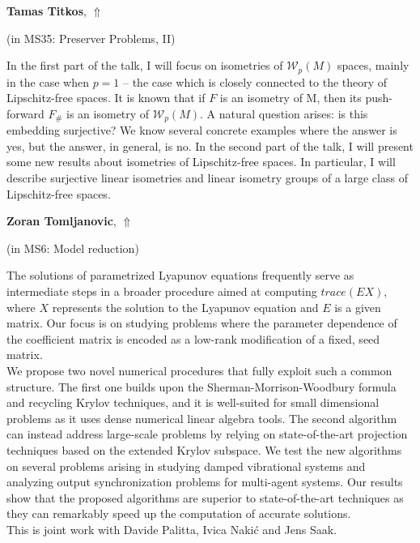 \documentclass[ILAS2025-program.tex]{subfiles}
\begin{document}
\hypertarget{down0315}{}\begin{ilasabstract}
    
\textbf{Tamas Titkos},  \hfill \hyperlink{up0315}{$\Uparrow$}
    
    
(in {\color{mstitle}MS35: Preserver Problems, II})
        
\mtskip
    In the first part of the talk, I will focus on isometries of $\mathcal{W}_p(M)$ spaces, mainly in the case when $p=1$ -- the case which is closely connected to the theory of Lipschitz-free spaces. It is known that if $F$ is an isometry of M, then its push-forward $F_{\#}$ is an isometry of $\mathcal{W}_p(M)$. A natural question arises: is this embedding surjective? We know several concrete examples where the answer is yes, but the answer, in general, is no. In the second part of the talk, I will present some new results about isometries of Lipschitz-free spaces. In particular, I will describe surjective linear isometries and linear isometry groups of a large class of Lipschitz-free spaces.

\end{ilasabstract}
    

\hypertarget{down0167}{}\begin{ilasabstract}
    
\textbf{Zoran Tomljanovic},  \hfill \hyperlink{up0167}{$\Uparrow$}
    
    
(in {\color{mstitle}MS6: Model reduction})
        
\mtskip
    The solutions of parametrized Lyapunov equations frequently serve as intermediate steps in a broader procedure aimed at computing $trace(EX)$, where $X$ represents the solution to the Lyapunov equation and $E$ is a given matrix. Our focus is on studying problems where the parameter dependence of the coefficient matrix is encoded as a low-rank modification of a fixed, seed matrix.\\
We propose two novel numerical procedures that fully exploit such a common structure. The first one builds upon the Sherman-Morrison-Woodbury   formula and recycling Krylov techniques, and it is well-suited for small dimensional problems as it uses dense numerical linear algebra tools. The second algorithm can instead address large-scale problems by relying on state-of-the-art projection techniques based on the extended Krylov subspace. We test the new algorithms on several problems arising in studying damped vibrational systems and analyzing output synchronization problems for multi-agent systems. Our results show that the proposed algorithms are superior to state-of-the-art techniques as they can remarkably speed up the computation of accurate solutions.\\
This is joint work with Davide Palitta, Ivica Naki\'{c} and Jens Saak.
\end{ilasabstract}
    
\end{document}
